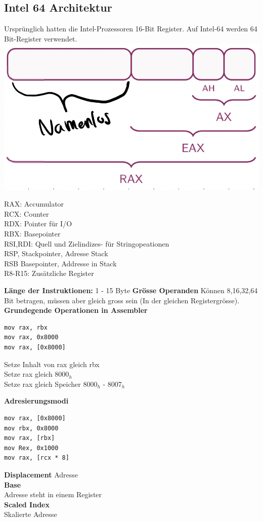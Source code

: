 \documentclass[7pt,landscape,a4paper]{scrartcl}
\begin{document}
\begin{multicols*}{4}
\subsection{Intel 64 Architektur}
\vspace{-0.75em}
Ursprünglich hatten die Intel-Prozessoren 16-Bit Register. Auf Intel-64 werden 64 Bit-Register verwendet.\\
\includegraphics[width=0.5\linewidth]{register}
\begin{minipage}[b]{0,5\linewidth}
RAX: Accumulator\\
RCX: Counter\\
RDX: Pointer für I/O\\
RBX: Basepointer\\
RSI,RDI: Quell und Zielindizes- für Stringopeationen\\
RSP, Stackpointer, Adresse Stack\\
RSB Basepointer, Addresse in Stack\\
R8-R15: Zusätzliche Register
\end{minipage}
\textbf{Länge der Instruktionen:} 1 - 15 Byte
\textbf{Grösse Operanden} Können 8,16,32,64 Bit betragen, müssen aber gleich gross sein (In der gleichen Registergrösse).\\
\textbf{Grundegende Operationen in Assembler}\\
\begin{minipage}[b]{0,35\linewidth}
\begin{verbatim}
mov rax, rbx
mov rax, 0x8000
mov rax, [0x8000]
\end{verbatim}
\end{minipage}
\begin{minipage}[b]{0,65\linewidth}
	Setze Inhalt von rax gleich rbx\\
	Setze rax gleich 8000$_{h}$\\
	Setze rax gleich Speicher 8000$_{h}$ - 8007$_{h}$ 
\end{minipage}
\textbf{Adresierungsmodi}\\
\begin{minipage}[b]{0,35\linewidth}
\begin{verbatim}
mov rax, [0x8000]
mov rbx, 0x8000
mov rax, [rbx]
mov Rex, 0x1000
mov rax, [rcx * 8]
\end{verbatim}
\end{minipage}
\begin{minipage}[b]{0,5\linewidth}
\textbf{Displacement} Adresse \\
\textbf{Base} \\
Adresse steht in einem Register \\
\textbf{Scaled Index} \\Skalierte Adresse
\end{minipage}


\end{multicols*}
\end{document}
